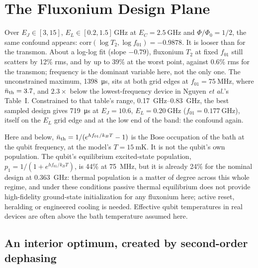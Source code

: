 \documentclass{SciPost}
\begin{document}
\section{The Fluxonium Design Plane}
\label{sec:fluxonium}

Over $E_J \in [3,15]$, $E_L \in [0.2,1.5]$\,GHz at $E_C = \SI{2.5}{\giga\hertz}$ and
$\Phi/\Phi_0 = 1/2$, the same confound appears: $\mathrm{corr}(\log T_2, \log f_{01}) = -0.9878$. It is looser than for
the transmon. About a log-log fit (slope $-0.79$), fluxonium $T_2$ at fixed $f_{01}$ still scatters by
12\% rms, and by up to 39\% at the worst point, against 0.6\% rms for the transmon; frequency is the
dominant variable here, not the only one. The unconstrained maximum, \SI{1398}{\micro\second}, sits at both grid edges at
$f_{01} = \SI{75}{\mega\hertz}$, where $\bar n_{\rm th} = 3.7$, and $2.3\times$ below the
lowest-frequency device in Nguyen \emph{et al.}'s Table~I. Constrained to that table's range,
\SIrange{0.17}{0.83}{\giga\hertz}, the best sampled design gives \SI{719}{\micro\second} at $E_J = 10.6$, $E_L = \SI{0.20}{\giga\hertz}$
($f_{01}=\SI{0.177}{\giga\hertz}$), itself on the $E_L$ grid edge and at the low end of the band: the
confound again.

Here and below, $\bar n_{\rm th} = 1/(e^{hf_{01}/k_BT}-1)$ is the Bose occupation of the bath at
the qubit frequency, at the model's $T = \SI{15}{\milli\kelvin}$. It is not the qubit's own
population. The qubit's equilibrium excited-state population, $p_1 = 1/(1+e^{hf_{01}/k_BT})$, is
44\% at \SI{75}{\mega\hertz}, but it is already 24\% for the nominal design at
\SI{0.363}{\giga\hertz}: thermal population is a matter of degree across this whole regime, and
under these conditions passive thermal equilibrium does not provide high-fidelity ground-state
initialization for any fluxonium here; active reset, heralding or engineered cooling is needed. Effective qubit temperatures in real devices
are often above the bath temperature assumed here.

\subsection{An interior optimum, created by second-order dephasing}
\end{document}
